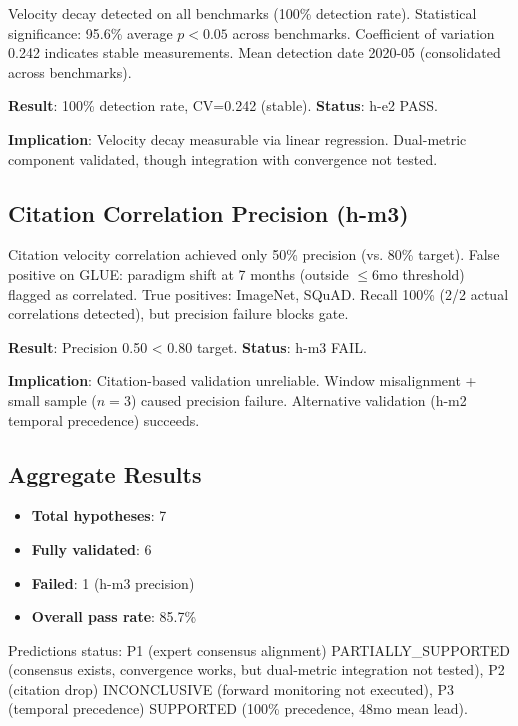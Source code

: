 Velocity decay detected on all benchmarks (100\% detection rate). Statistical significance: 95.6\% average $p<0.05$ across benchmarks. Coefficient of variation 0.242 indicates stable measurements. Mean detection date 2020-05 (consolidated across benchmarks).

\textbf{Result}: 100\% detection rate, CV=0.242 (stable). \textbf{Status}: h-e2 PASS.

\textbf{Implication}: Velocity decay measurable via linear regression. Dual-metric component validated, though integration with convergence not tested.

\subsection{Citation Correlation Precision (h-m3)}

Citation velocity correlation achieved only 50\% precision (vs. 80\% target). False positive on GLUE: paradigm shift at 7 months (outside $\leq 6$mo threshold) flagged as correlated. True positives: ImageNet, SQuAD. Recall 100\% (2/2 actual correlations detected), but precision failure blocks gate.

\textbf{Result}: Precision 0.50 < 0.80 target. \textbf{Status}: h-m3 FAIL.

\textbf{Implication}: Citation-based validation unreliable. Window misalignment + small sample ($n=3$) caused precision failure. Alternative validation (h-m2 temporal precedence) succeeds.

\subsection{Aggregate Results}

\begin{itemize}
\item \textbf{Total hypotheses}: 7
\item \textbf{Fully validated}: 6
\item \textbf{Failed}: 1 (h-m3 precision)
\item \textbf{Overall pass rate}: 85.7\%
\end{itemize}

Predictions status: P1 (expert consensus alignment) PARTIALLY\_SUPPORTED (consensus exists, convergence works, but dual-metric integration not tested), P2 (citation drop) INCONCLUSIVE (forward monitoring not executed), P3 (temporal precedence) SUPPORTED (100\% precedence, 48mo mean lead).
